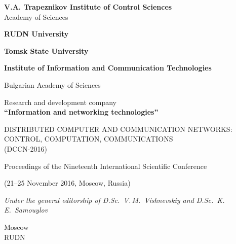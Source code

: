 {

\thispagestyle{empty}

\begin{center}
\textbf{V.A. Trapeznikov Institute of Control Sciences}\\
Academy of Sciences

\textbf{RUDN University}

\textbf{Tomsk State University}

\textbf{Institute of Information and Communication Technologies}


Bulgarian Academy of Sciences


Research and development company\\
\textbf{``Information and networking technologies''}
\end{center}

\bigskip
\bigskip
\bigskip

\begin{center}
\LARGE
\MakeUppercase{Distributed Computer and Communication Networks: Control, Computation,
Communications}\\
\MakeUppercase{(DCCN-2016)}
\end{center}

\bigskip

\begin{center}
Proceedings of the Nineteenth International Scientific Conference
\end{center}

\begin{center}
\volumeEn
\end{center}

\begin{center}
(21–25 November 2016, Moscow, Russia)
\end{center}


\bigskip

\begin{center}
  \textit{Under the general editorship of D.Sc.~V.\,M.~Vishnevskiy and
    D.Sc.~K.\,E.~Samouylov}
\end{center}


\vfill

\begin{center}
Moscow\\
RUDN\\
\year
\end{center}

} %

\clearpage